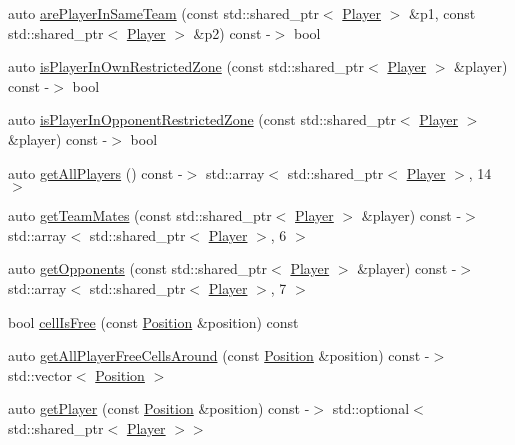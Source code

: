 \begin{DoxyCompactItemize}
\item 
auto \hyperlink{classgame_model_1_1_environment_a0c6939ea74a7dd670e5936b90d48dc65}{are\-Player\-In\-Same\-Team} (const std\-::shared\-\_\-ptr$<$ \hyperlink{classgame_model_1_1_player}{Player} $>$ \&p1, const std\-::shared\-\_\-ptr$<$ \hyperlink{classgame_model_1_1_player}{Player} $>$ \&p2) const -\/$>$ bool
\item 
auto \hyperlink{classgame_model_1_1_environment_a846741d971c9b1d21ad1ba2bd88532f1}{is\-Player\-In\-Own\-Restricted\-Zone} (const std\-::shared\-\_\-ptr$<$ \hyperlink{classgame_model_1_1_player}{Player} $>$ \&player) const -\/$>$ bool
\item 
auto \hyperlink{classgame_model_1_1_environment_a92637ac80e4dae2392a296bae5606b89}{is\-Player\-In\-Opponent\-Restricted\-Zone} (const std\-::shared\-\_\-ptr$<$ \hyperlink{classgame_model_1_1_player}{Player} $>$ \&player) const -\/$>$ bool
\item 
auto \hyperlink{classgame_model_1_1_environment_a33e0d834f58e41ad5551a06ee220076a}{get\-All\-Players} () const -\/$>$ std\-::array$<$ std\-::shared\-\_\-ptr$<$ \hyperlink{classgame_model_1_1_player}{Player} $>$, 14 $>$
\item 
auto \hyperlink{classgame_model_1_1_environment_a3122c0963d935543e2a7da1303772124}{get\-Team\-Mates} (const std\-::shared\-\_\-ptr$<$ \hyperlink{classgame_model_1_1_player}{Player} $>$ \&player) const -\/$>$ std\-::array$<$ std\-::shared\-\_\-ptr$<$ \hyperlink{classgame_model_1_1_player}{Player} $>$, 6 $>$
\item 
auto \hyperlink{classgame_model_1_1_environment_ab3bc9e490d18df58fbbe4f5f3dfd1b05}{get\-Opponents} (const std\-::shared\-\_\-ptr$<$ \hyperlink{classgame_model_1_1_player}{Player} $>$ \&player) const -\/$>$ std\-::array$<$ std\-::shared\-\_\-ptr$<$ \hyperlink{classgame_model_1_1_player}{Player} $>$, 7 $>$
\item 
bool \hyperlink{classgame_model_1_1_environment_a1e3c326a8a358e9de0e5144ac5a42af2}{cell\-Is\-Free} (const \hyperlink{structgame_model_1_1_position}{Position} \&position) const 
\item 
auto \hyperlink{classgame_model_1_1_environment_a9ce8f0bc1d424b585bdc030205d48903}{get\-All\-Player\-Free\-Cells\-Around} (const \hyperlink{structgame_model_1_1_position}{Position} \&position) const -\/$>$ std\-::vector$<$ \hyperlink{structgame_model_1_1_position}{Position} $>$
\item 
auto \hyperlink{classgame_model_1_1_environment_ad50b8cb84c76a6dbbfa9f8210918a4c2}{get\-Player} (const \hyperlink{structgame_model_1_1_position}{Position} \&position) const -\/$>$ std\-::optional$<$ std\-::shared\-\_\-ptr$<$ \hyperlink{classgame_model_1_1_player}{Player} $>$$>$
$$
\end{DoxyCompactItemize}
